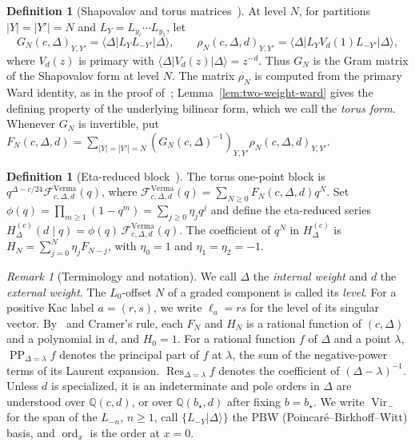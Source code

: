\documentclass[twoside,10pt]{article}
\numberwithin{equation}{section}
\theoremstyle{slbody}
\theoremstyle{definition}
\newtheorem{definition}[theorem]{Definition}
\theoremstyle{remark}
\newtheorem{remark}[theorem]{Remark}
\newcommand{\Vir}{\operatorname{Vir}}
\newcommand{\PP}{\operatorname{PP}}
\newcommand{\ord}{\operatorname{ord}}
\newcommand{\Res}{\operatorname{Res}}
\begin{document}
\begin{definition}[Shapovalov and torus matrices~{\cite[Definition~2.2]{PolzerColliding2026}}]\label{def:matrices}
At level \(N\), for partitions \(|Y|=|Y'|=N\) and \(L_Y=L_{y_\ell}\cdots L_{y_1}\), let
\[
 G_N(c,\Delta)_{Y,Y'}=\langle\Delta|L_YL_{-Y'}|\Delta\rangle,
 \qquad
 \rho_N(c,\Delta,d)_{Y,Y'}=\langle\Delta|L_YV_d(1)L_{-Y'}|\Delta\rangle,
\]
where \(V_d(z)\) is primary with \(\langle\Delta|V_d(z)|\Delta\rangle=z^{-d}\).
Thus \(G_N\) is the Gram matrix of the Shapovalov form at level \(N\).  The
matrix \(\rho_N\) is computed from the primary Ward identity, as in the proof of~\cite[Lemma~2.4]{PolzerColliding2026};
Lemma~\ref{lem:two-weight-ward} gives the defining property of the
underlying bilinear form, which we call the \emph{torus form}.  Whenever \(G_N\) is invertible, put
\(F_N(c,\Delta,d)=\sum_{|Y|=|Y'|=N}(G_N(c,\Delta)^{-1})_{Y,Y'}\rho_N(c,\Delta,d)_{Y,Y'}\).
\end{definition}

\begin{definition}[Eta-reduced block~{\cite[Definition~2.3]{PolzerColliding2026}}]\label{def:eta-reduced}
The torus one-point block is
\(q^{\Delta-c/24}\mathcal F^{\mathrm{Verma}}_{c,\Delta,d}(q)\), where
\(\mathcal F^{\mathrm{Verma}}_{c,\Delta,d}(q)=\sum_{N\geq0}F_N(c,\Delta,d)q^N\).
Set \(\phi(q)=\prod_{m\geq1}(1-q^m)=\sum_{j\geq0}\eta_jq^j\) and define the
eta-reduced series
\(H_\Delta^{(c)}(d\mid q)=\phi(q)\,\mathcal F^{\mathrm{Verma}}_{c,\Delta,d}(q)\).
The coefficient of \(q^N\) in \(H_\Delta^{(c)}\) is \(H_N=\sum_{j=0}^N\eta_jF_{N-j}\),
with \(\eta_0=1\) and \(\eta_1=\eta_2=-1\).
\end{definition}

\begin{remark}[Terminology and notation]\label{rem:notation}
We call \(\Delta\) the \emph{internal weight} and \(d\) the \emph{external
weight}.  The \(L_0\)-offset \(N\) of a graded component is called its
\emph{level}.  For a positive Kac label \(a=(r,s)\), we write
\(\ell_a=rs\) for the level of its singular vector.
By~\cite[Lemma~2.4]{PolzerColliding2026} and
Cramer's rule, each \(F_N\) and \(H_N\) is a rational function of
\((c,\Delta)\) and a polynomial in \(d\), and \(H_0=1\).  For a rational
function \(f\) of \(\Delta\) and a point \(\lambda\),
\(\PP_{\Delta=\lambda}f\) denotes the principal part of \(f\) at \(\lambda\),
the sum of the negative-power terms of its Laurent expansion.
\(\Res_{\Delta=\lambda}f\) denotes the coefficient of
\((\Delta-\lambda)^{-1}\).
Unless \(d\) is specialized, it is an indeterminate and pole
orders in \(\Delta\) are understood over \(\mathbb Q(c,d)\), or over
\(\mathbb Q(b_\star,d)\) after fixing \(b=b_\star\).  We write \(\Vir_-\) for the span
of the \(L_{-n}\), \(n\geq1\), call \(\{L_{-Y}\lvert\Delta\rangle\}\) the PBW
(Poincar\'e--Birkhoff--Witt) basis, and \(\ord_x\) is the order at \(x=0\).
\end{remark}
\end{document}
